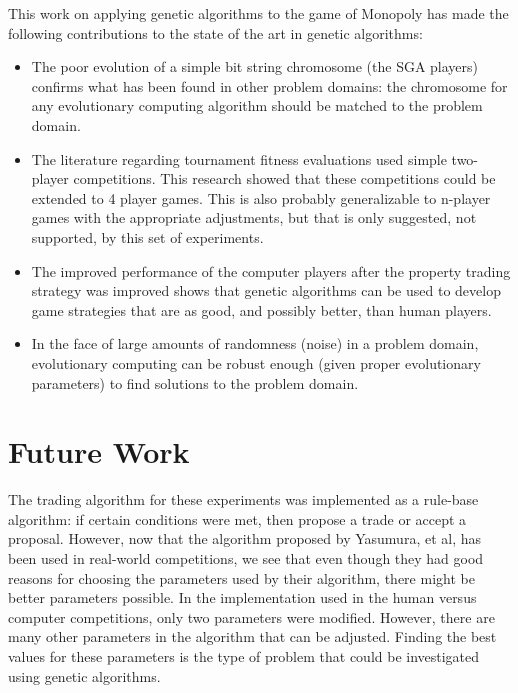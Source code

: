 This work on applying genetic algorithms to the game of Monopoly has made the
following contributions to the state of the art in genetic algorithms:
\begin{itemize} 
  \item {The poor evolution of a simple bit string chromosome (the SGA players) 
  confirms what has been found in other problem domains: the chromosome for any
  evolutionary computing algorithm should be matched to the problem domain.}
   
  \item {The literature regarding tournament fitness evaluations used simple
  two-player competitions. This research showed that these competitions could be
  extended to 4 player games. This is also probably generalizable to n-player
  games with the appropriate adjustments, but that is only suggested, not
  supported, by this set of experiments.}
  
  \item {The improved performance of the computer players after the property
  trading strategy was improved shows that genetic algorithms can be used to
  develop game strategies that are as good, and possibly better, than human
  players.}
  
  \item {In the face of large amounts of randomness (noise) in a problem domain,
  evolutionary computing can be robust enough (given proper evolutionary
  parameters) to find solutions to the problem domain.}

\end{itemize}

\section{Future Work}

The trading algorithm for these experiments was implemented as a rule-base
algorithm: if certain conditions were met, then propose a trade or accept a
proposal. However, now that the algorithm proposed by Yasumura, et al, has been
used in real-world competitions, we see that even though they had good reasons
for choosing the parameters used by their algorithm, there might be better
parameters possible. In the implementation used in the human versus computer
competitions, only two parameters were modified. However, there are many other
parameters in the algorithm that can be adjusted. Finding the best values for
these parameters is the type of problem that could be investigated using genetic
algorithms.

